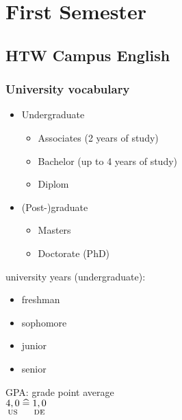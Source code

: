






\maketitle
\newpage
\tableofcontents
\newpage
\chapter{First Semester}

\section{HTW Campus English}

\subsection*{University vocabulary}
\begin{itemize}
\item Undergraduate
\begin{itemize}[label=$\rightarrow$]
\item Associates (2 years of study)
\item Bachelor (up to 4 years of study)
\item Diplom
\end{itemize}
\item (Post-)graduate
\begin{itemize}[label=$\rightarrow$]
\item Masters
\item Doctorate (PhD)
\end{itemize}
\end{itemize}
university years (undergraduate):
\begin{itemize}
\item freshman
\item sophomore
\item junior
\item senior
\end{itemize}
GPA: grade point average\\
$\underset{\text{US}}{4,0}\;\widehat{=}\; \underset{\text{DE}}{1,0} $
